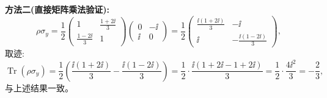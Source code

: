\begin{question}
\begin{solution}
\textbf{方法二(直接矩阵乘法验证):}
\[
\rho\sigma_y = \frac{1}{2}\begin{pmatrix}
1 & \frac{1+2\ii}{3} \\[4pt]
\frac{1-2\ii}{3} & 1
\end{pmatrix}
\begin{pmatrix}
0 & -\ii \\ \ii & 0
\end{pmatrix}
= \frac{1}{2}\begin{pmatrix}
\frac{\ii(1+2\ii)}{3} & -\ii \\[4pt]
\ii & -\frac{\ii(1-2\ii)}{3}
\end{pmatrix},
\]
取迹:
\[
\operatorname{Tr}(\rho\sigma_y) = \frac{1}{2}\left(\frac{\ii(1+2\ii)}{3} - \frac{\ii(1-2\ii)}{3}\right)
= \frac{1}{2}\cdot\frac{\ii(1+2\ii-1+2\ii)}{3}
= \frac{1}{2}\cdot\frac{4\ii^2}{3} = -\frac{2}{3},
\]
与上述结果一致。
\end{solution}
\end{question}

